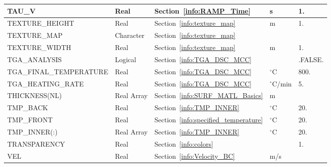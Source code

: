 \documentclass[11pt]{book}
\begin{document}
\begin{longtable}{@{\extracolsep{\fill}}|l|l|l|l|l|}
{\ct TAU\_V}                            & Real            & Section~\ref{info:RAMP_Time}              & s                   & 1.                      \\ \hline
{\ct TEXTURE\_HEIGHT}                   & Real            & Section~\ref{info:texture_map}            & m                   & 1.                      \\ \hline
{\ct TEXTURE\_MAP}                      & Character       & Section~\ref{info:texture_map}            &                     &                         \\ \hline
{\ct TEXTURE\_WIDTH}                    & Real            & Section~\ref{info:texture_map}            & m                   & 1.                      \\ \hline
{\ct TGA\_ANALYSIS}                     & Logical         & Section~\ref{info:TGA_DSC_MCC}            &                     & {\ct .FALSE.}           \\ \hline
{\ct TGA\_FINAL\_TEMPERATURE}           & Real            & Section~\ref{info:TGA_DSC_MCC}            & $^\circ$C           & 800.                    \\ \hline
{\ct TGA\_HEATING\_RATE}                & Real            & Section~\ref{info:TGA_DSC_MCC}            & $^\circ$C/min       & 5.                      \\ \hline
{\ct THICKNESS(NL)}                     & Real Array      & Section~\ref{info:SURF_MATL_Basics}       & m                   &                         \\ \hline
{\ct TMP\_BACK}                         & Real            & Section~\ref{info:TMP_INNER}              & $^\circ$C           & 20.                     \\ \hline
{\ct TMP\_FRONT}                        & Real            & Section~\ref{info:specified_temperature}  & $^\circ$C           & 20.                     \\ \hline
{\ct TMP\_INNER(:)}                     & Real Array      & Section~\ref{info:TMP_INNER}              & $^\circ$C           & 20.                     \\ \hline
{\ct TRANSPARENCY}                      & Real            & Section~\ref{info:colors}                 &                     & 1.                      \\ \hline
{\ct VEL    }                           & Real            & Section~\ref{info:Velocity_BC}            & m/s                 &                         \\ \hline

\end{longtable}
\end{document}
